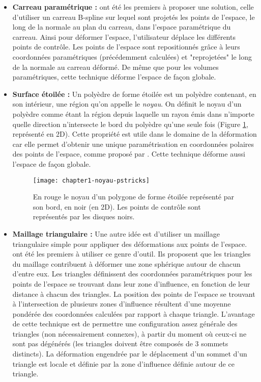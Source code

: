 \begin{itemize}

\item{\textbf{Carreau paramétrique :}} \cite{JLQ96} ont été les premiers à
proposer une solution, celle d'utiliser un carreau B-spline sur lequel sont
projetés les points de l'espace, le long de la normale au plan du carreau,
dans l'espace paramétrique du carreau. Ainsi pour déformer l'espace,
l'utilisateur déplace les différents points de contrôle. Les points de
l'espace sont repositionnés grâce à leurs coordonnées paramétriques
(précédemment calculées) et "reprojetées" le long de la normale au carreau
déformé. De même que pour les volumes paramétriques, cette technique déforme
l'espace de façon globale.

\item{\textbf{Surface étoilée :}} Un polyèdre de forme étoilée est un polyèdre
contenant, en son intérieur, une région qu'on appelle le \textit{noyau}. On
définit le noyau d'un polyèdre comme étant la région depuis laquelle un rayon
émis dans n'importe quelle direction n'intersecte le bord du polyèdre qu'une
seule fois (Figure \ref{SUReto}, représenté en 2D). Cette propriété est utile
dans le domaine de la déformation car elle permet d'obtenir une unique
paramétrisation en coordonnées polaires des points de l'espace, comme proposé
par \cite{JL00}. Cette technique déforme aussi l'espace de façon globale.

 \begin{figure}[ht]
 \begin{center}
  \texttt{[image: chapter1-noyau-pstricks]}

  \caption[Noyau d'un polygone] {En rouge le noyau d'un polygone de forme
étoilée représenté par son bord, en noir (en 2D). Les points de contrôle sont
représentés par les disques noirs.}

  \label{SUReto}
 \end{center}
 \end{figure}

\item{\textbf{Maillage triangulaire :}} Une autre idée est d'utiliser un
maillage triangulaire simple pour appliquer des déformations aux points de
l'espace. \cite{KO03} ont été les premiers à utiliser ce genre d'outil. Ils
proposent que les triangles du maillage contribuent à déformer une zone
sphérique autour de chacun d'entre eux. Les triangles définissent des
coordonnées paramétriques pour les points de l'espace se trouvant dans leur
zone d'influence, en fonction de leur distance à chacun des triangles. La
position des points de l'espace se trouvant à l'intersection de plusieurs
zones d'influence résultent d'une moyenne pondérée des coordonnées calculées
par rapport à chaque triangle. L'avantage de cette technique est de permettre
une configuration assez générale des triangles (non nécessairement connexes),
à partir du moment où ceux-ci ne sont pas dégénérés (les triangles doivent
être composés de 3 sommets distincts). La déformation engendrée par le
déplacement d'un sommet d'un triangle est locale et définie par la zone
d'influence définie autour de ce triangle.


\end{itemize}
